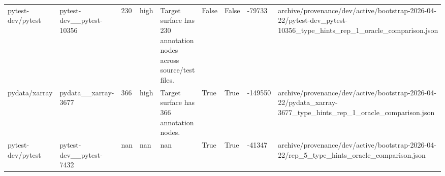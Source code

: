 \begin{tabular}{lllllllll}
pytest-dev/pytest & pytest-dev\_\_pytest-10356 & 230 & high & Target surface has 230 annotation nodes across source/test files. & False & False & -79733 & archive/provenance/dev/active/bootstrap-2026-04-22/pytest-dev\_pytest-10356\_type\_hints\_rep\_1\_oracle\_comparison.json \\
pydata/xarray & pydata\_\_xarray-3677 & 366 & high & Target surface has 366 annotation nodes. & True & True & -149550 & archive/provenance/dev/active/bootstrap-2026-04-22/pydata\_xarray-3677\_type\_hints\_rep\_1\_oracle\_comparison.json \\
pytest-dev/pytest & pytest-dev\_\_pytest-7432 & nan & nan & nan & True & True & -41347 & archive/provenance/dev/active/bootstrap-2026-04-22/rep\_5\_type\_hints\_oracle\_comparison.json \\
\bottomrule
\end{tabular}
